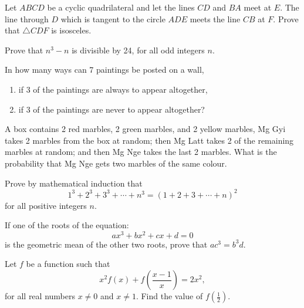 \begin{problems}
    \problem Let $ABCD$ be a cyclic quadrilateral and let the lines $CD$ and
    $BA$ meet at $E$. The line through $D$ which is tangent to the circle $ADE$
    meets the line $CB$ at $F$. Prove that $\triangle CDF$ is isosceles. 

    \problem Prove that $n^3 - n$ is divisible by 24, for all odd integers $n$. 

    \problem In how many ways can 7 paintings be posted on a wall,
    \begin{enumerate} \item if 3 of the paintings are always to appear
        altogether,
        
        \item if 3 of the paintings are never to appear altogether?
    \end{enumerate}

    \problem A box contains 2 red marbles, 2 green marbles, and 2 yellow
    marbles, Mg Gyi takes 2 marbles from the box at random; then Mg Latt takes
    2 of the remaining marbles at random; and then Mg Nge takes the last 2
    marbles. What is the probability that Mg Nge gets two marbles of the same
    colour. 

    \problem Prove by mathematical induction that \[1^3 + 2^3 + 3^3 + \cdots +
    n^3 =(1 + 2 + 3 + \cdots + n)^2\] for all positive integers $n$. 

    \problem If one of the roots of the equation: \[ax^3 + bx^2 + cx + d = 0\]
    is the geometric mean of the other two roots, prove that $ac^3 = b^3d$.
    
    \problem Let $f$ be a function such that \[x^2f(x) +
    f\left(\frac{x-1}{x}\right) = 2x^2,\] for all real numbers $x \ne 0$ and $x
    \ne 1$. Find the value of $f\left(\frac{1}{2}\right)$. 
\end{problems}
